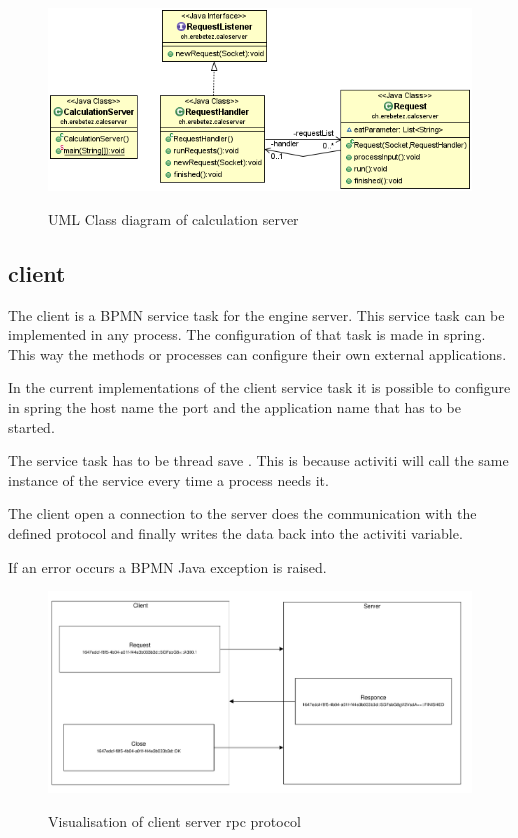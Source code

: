 \documentclass[paper=a4,twoside=false,BCOR=0mm,DIV=calc,fontsize=12pt]{scrartcl}
\begin{document}
\begin{figure}
    \begin{center}
       \includegraphics[width=1\textwidth]{./img/calcServerUML.png}\\
    \end{center}
  \caption{UML Class diagram of calculation server}
  \label{uml_calculationserver}
\end{figure} 


\subsection{client}
The client is a BPMN service task for the engine server. This service task can be implemented in any process. 
The configuration of that task is made in spring. This way the methods or processes can configure their own external applications.

In the current implementations of the client service task it is possible to configure in spring the host name the port and the application name that has to be started.

The service task has to be thread save \cite{treadsave}. This is because activiti will call the same instance of the service every time a process needs it. 

The client open a connection to the server does the communication with the defined protocol and finally writes the data back into the activiti variable.

If an error occurs a BPMN Java exception is raised.

\begin{figure}
    \begin{center}
       \includegraphics[width=1\textwidth]{./img/clientServerProtocoll.pdf}\\
    \end{center}
  \caption{Visualisation of client server rpc protocol}
  \label{protocol}
\end{figure} 
\end{document}
